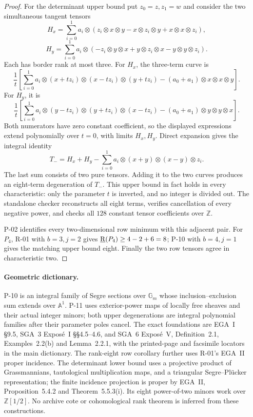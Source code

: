 \begin{proof}
For the determinant upper bound put $z_0=z,z_1=w$ and
consider the two simultaneous tangent tensors
\[
 H_x=\sum_{i=0}^1a_i\otimes
 (z_i\otimes x\otimes y-x\otimes z_i\otimes y
                         +x\otimes x\otimes z_i),
\]
\[
 H_y=\sum_{i=0}^1a_i\otimes
 (-z_i\otimes y\otimes x+y\otimes z_i\otimes x
                         -y\otimes y\otimes z_i).
\]
Each has border rank at most three. For $H_x$, the
three-term curve is
\[
 \frac{1}{t}\left[
 \sum_{i=0}^1a_i\otimes(x+tz_i)\otimes(x-tz_i)\otimes(y+tz_i)
 -(a_0+a_1)\otimes x\otimes x\otimes y\right].
\]
For $H_y$, it is
\[
 \frac{1}{t}\left[
 \sum_{i=0}^1a_i\otimes(y-tz_i)\otimes(y+tz_i)\otimes(x-tz_i)
 -(a_0+a_1)\otimes y\otimes y\otimes x\right].
\]
Both numerators have zero constant coefficient, so
the displayed expressions extend polynomially over
$t=0$, with limits $H_x,H_y$. Direct expansion gives
the integral identity
\[
 T_-=H_x+H_y-
       \sum_{i=0}^1a_i\otimes(x+y)\otimes(x-y)\otimes z_i.
\]
The last sum consists of two pure tensors. Adding it
to the two curves produces an eight-term degeneration
of $T_-$. This upper bound in fact holds in every
characteristic: only the parameter $t$ is inverted,
and no integer is divided out. The standalone checker
reconstructs all eight terms, verifies cancellation of
every negative power, and checks all $128$ constant
tensor coefficients over $\mathbb Z$.

P-02 identifies every two-dimensional row minimum with
this adjacent pair. For $P_4$, R-01 with $b=3,j=2$
gives $\underline{\mathrm R}(P_4)\geq4-2+6=8$; P-10 with $b=4,j=1$
gives the matching upper bound eight. Finally the two
row tensors agree in characteristic two.
\end{proof}

\paragraph{Geometric dictionary.}
P-10 is an integral family of Segre sections over
$\mathbb G_m$ whose inclusion--exclusion sum extends
over $\mathbb A^1$. P-11 uses exterior-power maps of
locally free sheaves and their actual integer minors;
both upper degenerations are integral polynomial
families after their parameter poles cancel. The exact
foundations are EGA~I \S9.5,
SGA~3 Expos\'e~I \S\S4.5--4.6, and SGA~6 Expos\'e~V,
Definition~2.1, Examples~2.2(b) and Lemma~2.2.1, with
the printed-page and facsimile locators in the main
dictionary. The rank-eight row corollary further uses
R-01's EGA~II proper incidence. The determinant lower
bound uses a projective product of Grassmannians,
tautological multiplication maps, and a triangular
Segre--Pl\"ucker representation; the finite incidence
projection is proper by EGA~II, Proposition~5.4.2 and
Theorem~5.5.3(i). Its eight power-of-two minors work
over $\mathbb Z[1/2]$. No archive cote or
cohomological rank theorem is inferred from these
constructions.
